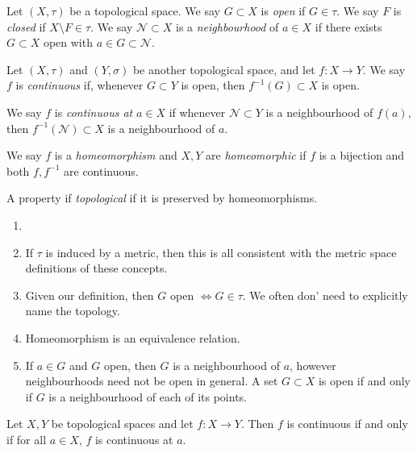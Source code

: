 \documentclass[12pt]{article}
\begin{document}
\begin{definition}
	Let $(X, \tau)$ be a topological space. We say $G \subset X$ is \textit{open} if $G \in \tau$. We say $F$ is \textit{closed} if $X \setminus F \in \tau$. We say $\mathcal{N} \subset X$ is a \textit{neighbourhood} of $a \in X$ if there exists $G \subset X$ open with $a \in G \subset \mathcal{N}$.
\end{definition}

\begin{definition}
	Let $(X, \tau)$ and $(Y, \sigma)$ be another topological space, and let $f : X \to Y$. We say $f$ is \textit{continuous} if, whenever $G \subset Y$ is open, then $f^{-1}(G) \subset X$ is open.

	We say $f$ is \textit{continuous at} $a \in X$ if whenever $\mathcal{N} \subset Y$ is a neighbourhood of $f(a)$, then $f^{-1}(\mathcal{N}) \subset X$ is a neighbourhood of $a$.

	We say $f$ is a \textit{homeomorphism} and $X, Y$ are \textit{homeomorphic} if $f$ is a bijection and both $f, f^{-1}$ are continuous.

	A property if \textit{topological} if it is preserved by homeomorphisms.
\end{definition}

\begin{remark}
	\begin{enumerate}[1.]
		\item[]
		\item If $\tau$ is induced by a metric, then this is all consistent with the metric space definitions of these concepts.
		\item Given our definition, then $G$ open $\iff G \in \tau$. We often don' need to explicitly name the topology.
		\item Homeomorphism is an equivalence relation.
		\item If $a \in G$ and $G$ open, then $G$ is a neighbourhood of $a$, however neighbourhoods need not be open in general. A set $G \subset X$ is open if and only if $G$ is a neighbourhood of each of its points.
	\end{enumerate}
\end{remark}

\begin{proposition}
	Let $X, Y$ be topological spaces and let $f : X \to Y$. Then $f$ is continuous if and only if for all $a \in X$, $f$ is continuous at $a$.
\end{proposition}
\end{document}
